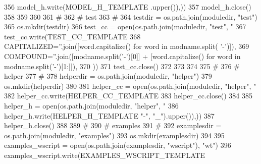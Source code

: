 \begin{DoxyCode}
{{{{{356     model\_h.write(MODEL\_H\_TEMPLATE %
      .upper()),))
357     model\_h.close()
358 
359 
360 
361     \textcolor{comment}{#}
362     \textcolor{comment}{# test}
363     \textcolor{comment}{# }
364     testdir = os.path.join(moduledir, \textcolor{stringliteral}{"test"})
365     os.mkdir(testdir)
366     test\_cc = open(os.path.join(moduledir, \textcolor{stringliteral}{"test"}, \textcolor{stringliteral}{"%
367     test\_cc.write(TEST\_CC\_TEMPLATE %
368                                           CAPITALIZED=\textcolor{stringliteral}{''}.join([word.capitalize() \textcolor{keywordflow}{for} word \textcolor{keywordflow}{in} modname.split(\textcolor{stringliteral}{
      '-'})]),
369                                           COMPOUND=\textcolor{stringliteral}{''}.join([modname.split(\textcolor{stringliteral}{'-'})[0]] + [word.capitalize() \textcolor{keywordflow}{for}
       word \textcolor{keywordflow}{in} modname.split(\textcolor{stringliteral}{'-'})[1:]]),
370                                           ))
371     test\_cc.close()
372 
373 
374 
375     \textcolor{comment}{#}
376     \textcolor{comment}{# helper}
377     \textcolor{comment}{# }
378     helperdir = os.path.join(moduledir, \textcolor{stringliteral}{"helper"})
379     os.mkdir(helperdir)
380 
381     helper\_cc = open(os.path.join(moduledir, \textcolor{stringliteral}{"helper"}, \textcolor{stringliteral}{"%
382     helper\_cc.write(HELPER\_CC\_TEMPLATE %
383     helper\_cc.close()
384 
385     helper\_h = open(os.path.join(moduledir, \textcolor{stringliteral}{"helper"}, \textcolor{stringliteral}{"%
386     helper\_h.write(HELPER\_H\_TEMPLATE %
      "-"}, \textcolor{stringliteral}{"\_"}).upper()),))
387     helper\_h.close()
388 
389     \textcolor{comment}{#}
390     \textcolor{comment}{# examples}
391     \textcolor{comment}{#}
392     examplesdir = os.path.join(moduledir, \textcolor{stringliteral}{"examples"})
393     os.mkdir(examplesdir)
394 
395     examples\_wscript = open(os.path.join(examplesdir, \textcolor{stringliteral}{"wscript"}), \textcolor{stringliteral}{"wt"})
396     examples\_wscript.write(EXAMPLES\_WSCRIPT\_TEMPLATE %
}}}}}}}
\end{DoxyCode}

